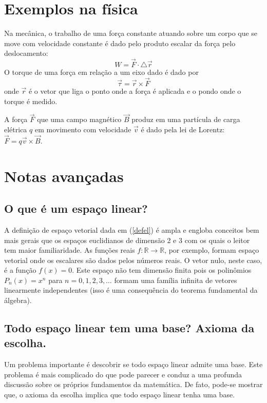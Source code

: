 \section{Exemplos na física}
Na mecânica, o trabalho de uma força constante atuando sobre um corpo que se move com velocidade constante é dado pelo produto escalar da força pelo deslocamento:
$$W=\vec{F}\cdot \triangle\vec{ r}$$
O torque de uma força em relação a um eixo dado é dado por
$$\vec{\tau}=\vec{r}\times \vec{F}$$
onde $\vec{r}$ é o vetor que liga o ponto onde a força é aplicada e o pondo onde o torque é medido.

A força $\vec{F}$ que uma campo magnético $\vec{B}$ produz em uma partícula de carga elétrica $q$ em movimento com velocidade $\vec{v}$ é dado pela lei de Lorentz:
$\vec{F}=q\vec{v}\times\vec{B}.$

\section{Notas avançadas}
\subsection{O que é um espaço linear?}
A definição de espaço vetorial dada em (\ref{defel}) é ampla e engloba conceitos bem mais gerais que os espaços euclidianos de dimensão 2 e 3 com os quais o leitor tem maior familiaridade. As funções reais $f:\mathbb{R}\to\mathbb{R}$, por exemplo, formam espaço vetorial onde os escalares são dados pelos números reais. O vetor nulo, neste caso, é a função $f(x)=0$. Este espaço não tem dimensão finita pois os polinômios $P_{n}(x)=x^n$ para $n=0,1,2,3,\ldots$ formam uma família infinita de vetores linearmente independentes (isso é uma consequência do teorema fundamental da álgebra).

\subsection{Todo espaço linear tem uma base? Axioma da escolha.}
Um problema importante é descobrir se todo espaço linear admite uma base. Este problema é mais complicado do que pode parecer e conduz a uma profunda discussão sobre os próprios fundamentos da matemática. De fato, pode-se mostrar que, o axioma da escolha implica que todo espaço linear tenha uma base.

